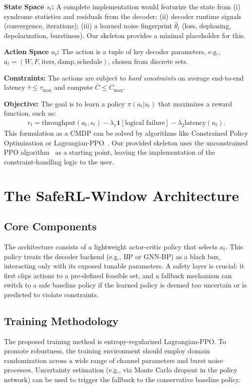 \documentclass[conference]{IEEEtran}
\begin{document}
\textbf{State Space $s_t$:} A complete implementation would featurize the state from (i) syndrome statistics and residuals from the decoder; (ii) decoder runtime signals (convergence, iterations); (iii) a learned noise fingerprint $\hat{\theta}_t$ (loss, dephasing, depolarization, burstiness). Our skeleton provides a minimal placeholder for this.

\textbf{Action Space $a_t$:} The action is a tuple of key decoder parameters, e.g., $a_t=(W,F,\text{iters},\text{damp},\text{schedule})$, chosen from discrete sets.

\textbf{Constraints:} The actions are subject to \emph{hard constraints} on average end-to-end latency $\bar{\tau}\le\tau_{\max}$ and compute $\bar{C}\le C_{\max}$.

\textbf{Objective:} The goal is to learn a policy $\pi(a_t|s_t)$ that maximizes a reward function, such as:
\begin{align}
r_t = \text{throughput}(a_t,s_t) - \lambda_1 \mathbf{1}[\text{logical failure}] - \lambda_2 \text{latency}(a_t).
\end{align}
This formulation as a CMDP can be solved by algorithms like Constrained Policy Optimization or Lagrangian-PPO~\cite{achiam2017constrained}. Our provided skeleton uses the unconstrained PPO algorithm~\cite{schulman2017proximal} as a starting point, leaving the implementation of the constraint-handling logic to the user.

\section{The SafeRL-Window Architecture}
\subsection{Core Components}
The architecture consists of a lightweight actor-critic policy that selects $a_t$. This policy treats the decoder backend (e.g., BP or GNN-BP) as a black box, interacting only with its exposed tunable parameters. A safety layer is crucial: it first clips actions to a pre-defined feasible set, and a fallback mechanism can switch to a safe baseline policy if the learned policy is deemed too uncertain or is predicted to violate constraints.

\subsection{Training Methodology}
The proposed training method is entropy-regularized Lagrangian-PPO. To promote robustness, the training environment should employ domain randomization across a wide range of channel parameters and burst noise processes. Uncertainty estimation (e.g., via Monte Carlo dropout in the policy network) can be used to trigger the fallback to the conservative baseline policy.
\end{document}
